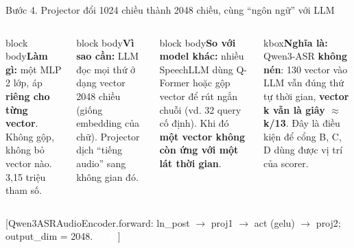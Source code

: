\documentclass[aspectratio=169,xcolor=table]{beamer}
\newcommand{\bad}[1]{\textcolor{RiskRed}{\textbf{#1}}}
\newcommand{\good}[1]{\textcolor{GoodGreen}{\textbf{#1}}}
\newcommand{\src}[1]{\par\vfill{\tiny\color{TextGray}[#1]}}
\newcommand{\ra}{$\rightarrow$}
\newcommand{\bsz}{\footnotesize}%
\newcommand{\nbox}[2][block body]{\begin{beamercolorbox}[sep=0.45em,rounded=true]{#1}\bsz #2\end{beamercolorbox}}
\newcommand{\nghiala}[1]{\begin{beamercolorbox}[sep=0.32em,rounded=true]{kbox}\bsz\textbf{Nghĩa là:} #1\end{beamercolorbox}}
\newcommand{\tagbox}[2]{{\scriptsize\colorbox{#1}{\textcolor{white}{\textbf{#2}}}}}
\newcommand{\CODE}{\tagbox{Secondary}{code}}
\begin{document}
\begin{frame}{Bước 4. Projector đổi 1024 chiều thành 2048 chiều, cùng ``ngôn ngữ'' với LLM}
\renewcommand{\bsz}{\scriptsize}
\centering
{}
\vspace{0.35cm}

\begin{columns}[T]
\nbox{\textbf{Làm gì:} một MLP 2 lớp, áp \textbf{riêng cho từng vector}. Không gộp, không bỏ vector nào. 3,15 triệu tham số.}
\vspace{0.08cm}
\nbox{\textbf{Vì sao cần:} LLM đọc mọi thứ ở dạng vector 2048 chiều (giống embedding của chữ). Projector dịch ``tiếng audio'' sang không gian đó.}
\nbox{\textbf{So với model khác:} nhiều SpeechLLM dùng Q-Former hoặc gộp vector để rút ngắn chuỗi (vd. 32 query cố định). Khi đó \bad{một vector không còn ứng với một lát thời gian}.}
\nghiala{Qwen3-ASR \good{không nén}: 130 vector vào LLM vẫn đúng thứ tự thời gian, \textbf{vector k vẫn là giây $\approx$ k/13}. Đây là điều kiện để cổng B, C, D dùng được vị trí của scorer.}
\end{columns}
\src{Qwen3ASRAudioEncoder.forward: ln\_post \ra{} proj1 \ra{} act (gelu) \ra{} proj2; output\_dim = 2048. \CODE}
\end{frame}
\end{document}
